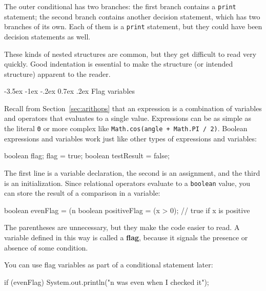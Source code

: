 \documentclass[12pt]{book}
\makeatletter
\theoremstyle{exercise}
\newcommand{\java}[1]{\verb"#1"}
\renewcommand{\section}{\@startsection{section}{1}{\z@}%
    {-3.5ex \@plus -1ex \@minus -.2ex}%
    {0.7ex \@plus.2ex}%
    {\normalfont\Large\bfseries}}
\newcommand{\java}[1]{\lstinline{#1}} %
\makeatother
\begin{document}
The outer conditional has two branches:
the first branch contains a \java{print} statement; the second branch contains another decision statement, which has two branches of its own.
Each of them is a \java{print} statement, but they could have been decision statements as well.

These kinds of nested structures are common, but they get difficult to read very quickly.
Good indentation is essential to make the structure (or intended structure) apparent to the reader.


\section{Flag variables}


Recall from Section~\ref{sec:arithops} that an expression is a combination of variables and operators that evaluates to a single value.
Expressions can be as simple as the literal \java{0} or more complex like \java{Math.cos(angle + Math.PI / 2)}.
Boolean expressions and variables work just like other types of expressions and variables:

\begin{code}
    boolean flag;
    flag = true;
    boolean testResult = false;
\end{code}


The first line is a variable declaration, the second is an assignment, and the third is an initialization.
Since relational operators evaluate to a \java{boolean} value, you can store the result of a comparison in a variable:

\begin{code}
    boolean evenFlag = (n %
    boolean positiveFlag = (x > 0);     // true if x is positive
\end{code}

The parentheses are unnecessary, but they make the code easier to read.
A variable defined in this way is called a {\bf flag}, because it signals the presence or absence of some condition.

You can use flag variables as part of a conditional statement later:

\begin{code}
    if (evenFlag) {
        System.out.println("n was even when I checked it");
    }
\end{code}
\end{document}
